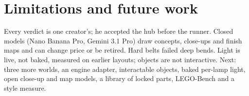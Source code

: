 \section{Limitations and future work}\label{limitations-and-future-work}

Every verdict is one creator's; he accepted the hub before the runner. Closed models (Nano Banana Pro, Gemini 3.1 Pro) draw concepts, close-ups and finish maps and can change price or be retired. Hard belts failed deep bends. Light is live, not baked, measured on earlier layouts; objects are not interactive. Next: three more worlds, an engine adapter, interactable objects, baked per-lamp light, open close-up and map models, a library of locked parts, LEGO-Bench \citep{li2026lego} and a style measure.
